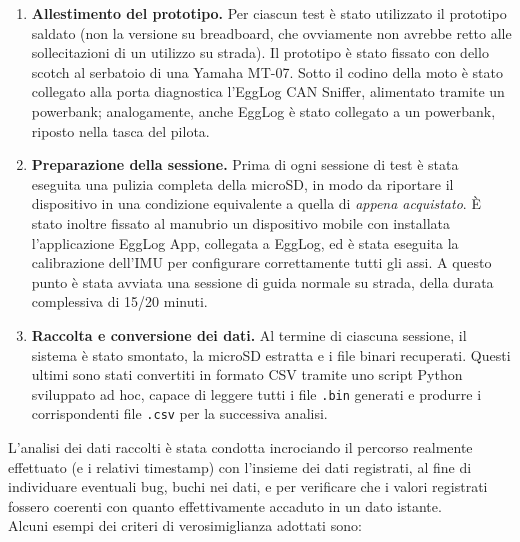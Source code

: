 \begin{enumerate}
    \item \textbf{Allestimento del prototipo.} Per ciascun test è stato
    utilizzato il prototipo saldato (non la versione su breadboard, che
    ovviamente non avrebbe retto alle sollecitazioni di un utilizzo su
    strada). Il prototipo è stato fissato con dello scotch al serbatoio di
    una Yamaha MT-07. Sotto il codino della moto è stato collegato alla
    porta diagnostica l'EggLog CAN Sniffer, alimentato tramite un
    powerbank; analogamente, anche EggLog è stato collegato a un
    powerbank, riposto nella tasca del pilota.

    \item \textbf{Preparazione della sessione.} Prima di ogni sessione di
    test è stata eseguita una pulizia completa della microSD, in modo da
    riportare il dispositivo in una condizione equivalente a quella di
    \textit{appena acquistato}. È stato inoltre fissato al manubrio un
    dispositivo mobile con installata l'applicazione EggLog App, collegata
    a EggLog, ed è stata eseguita la calibrazione dell'IMU per configurare
    correttamente tutti gli assi. A questo punto è stata avviata una
    sessione di guida normale su strada, della durata complessiva di
    15/20 minuti.

    \item \textbf{Raccolta e conversione dei dati.} Al termine di ciascuna
    sessione, il sistema è stato smontato, la microSD estratta e i file
    binari recuperati. Questi ultimi sono stati convertiti in formato CSV
    tramite uno script Python sviluppato ad hoc, capace di leggere tutti i
    file \texttt{.bin} generati e produrre i corrispondenti file
    \texttt{.csv} per la successiva analisi.
\end{enumerate}

\vspace{0.5cm}

L'analisi dei dati raccolti è stata condotta incrociando il percorso
realmente effettuato (e i relativi timestamp) con l'insieme dei dati
registrati, al fine di individuare eventuali bug, buchi nei dati, e per
verificare che i valori registrati fossero coerenti con quanto effettivamente
accaduto in un dato istante. \\

Alcuni esempi dei criteri di verosimiglianza adottati sono:

